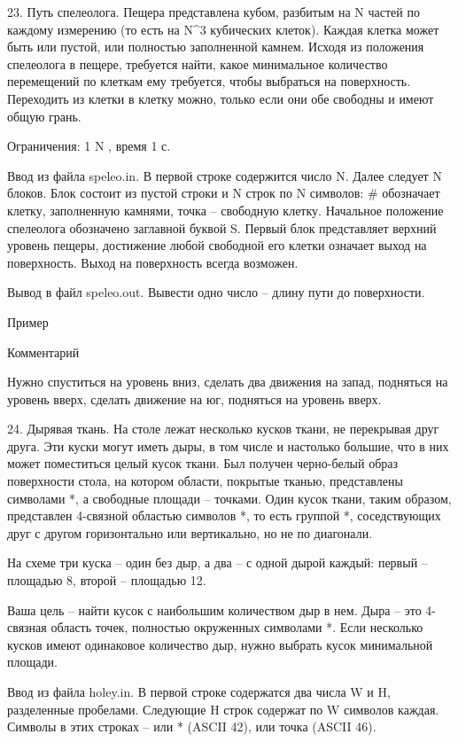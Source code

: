 \documentclass[]{article}
\begin{document}
\begin{enumerate}
23. Путь спелеолога. Пещера представлена кубом, разбитым на N частей по каждому измерению (то есть на N^3 кубических клеток). Каждая клетка может быть или пустой, или полностью заполненной камнем. Исходя из положения спелеолога в пещере, требуется найти, какое минимальное количество перемещений по клеткам ему требуется, чтобы выбраться на поверхность. Переходить из клетки в клетку можно, только если они обе свободны и имеют общую грань.

Ограничения: 1 \leq N , время 1 с.

Ввод из файла speleo.in. В первой строке содержится число N. Далее следует N блоков. Блок состоит из пустой строки и N строк по N символов: # обозначает клетку, заполненную камнями, точка – свободную клетку. Начальное положение спелеолога обозначено заглавной буквой S. Первый блок представляет верхний уровень пещеры, достижение любой свободной его клетки означает выход на поверхность. Выход на поверхность всегда возможен.

Вывод в файл speleo.out. Вывести одно число – длину пути до поверхности.

Пример



Комментарий

Нужно спуститься на уровень вниз, сделать два движения на запад, подняться на уровень вверх, сделать движение на юг, подняться на уровень вверх.

24. Дырявая ткань. На столе лежат несколько кусков ткани, не перекрывая друг друга. Эти куски могут иметь дыры, в том числе и настолько большие, что в них может поместиться целый кусок ткани. Был получен черно-белый образ поверхности стола, на котором области, покрытые тканью, представлены символами *, а свободные площади – точками. Один кусок ткани, таким образом, представлен 4-связной областью символов *, то есть группой *, соседствующих друг с другом горизонтально или вертикально, но не по диагонали.



На схеме три куска – один без дыр, а два – с одной дырой каждый: первый – площадью 8, второй – площадью 12.

Ваша цель – найти кусок с наибольшим количеством дыр в нем. Дыра – это 4-связная область точек, полностью окруженных символами *. Если несколько кусков имеют одинаковое количество дыр, нужно выбрать кусок минимальной площади.

Ввод из файла holey.in. В первой строке содержатся два числа W и H, разделенные пробелами. Следующие H строк содержат по W символов каждая. Символы в этих строках – или * (ASCII 42), или точка (ASCII 46).


\end{enumerate}
\end{document}
